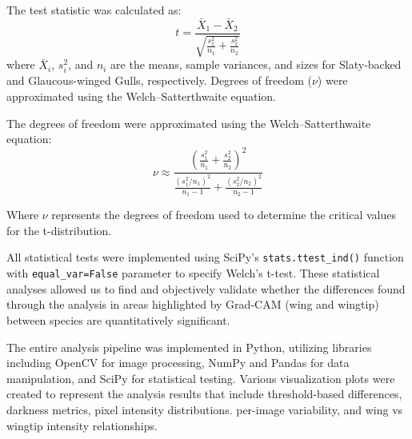 \documentclass[a4paper,12pt]{report}
\begin{document}
The test statistic was calculated as:  
\begin{equation}  
t = \frac{\bar{X}_1 - \bar{X}_2}{\sqrt{\frac{s_1^2}{n_1} + \frac{s_2^2}{n_2}}}  
\end{equation}  
where $\bar{X}_i$, $s_i^2$, and $n_i$ are the means, sample variances, and sizes for Slaty-backed and Glaucous-winged Gulls, respectively. Degrees of freedom ($\nu$) were approximated using the Welch–Satterthwaite equation.  



The degrees of freedom were approximated using the Welch--Satterthwaite equation:
\begin{equation}
\nu \approx \frac{\left(\frac{s_1^2}{n_1} + \frac{s_2^2}{n_2}\right)^2}{\frac{(s_1^2/n_1)^2}{n_1-1} + \frac{(s_2^2/n_2)^2}{n_2-1}}
\end{equation}

Where $\nu$ represents the degrees of freedom used to determine the critical values for the t-distribution.

All statistical tests were implemented using SciPy's \texttt{stats.ttest\_ind()} function with \texttt{equal\_var=False} parameter to specify Welch's t-test. These statistical analyses allowed us to find and objectively validate whether the differences found through the analysis in areas highlighted by Grad-CAM (wing and wingtip) between species are quantitatively significant.

The entire analysis pipeline was implemented in Python, utilizing libraries including OpenCV for image processing, NumPy and Pandas for data manipulation, and SciPy for statistical testing. Various visualization plots were created to represent the analysis results that include threshold-based differences, darkness metrics, pixel intensity distributions. per-image variability, and wing vs wingtip intensity relationships.
\end{document}
